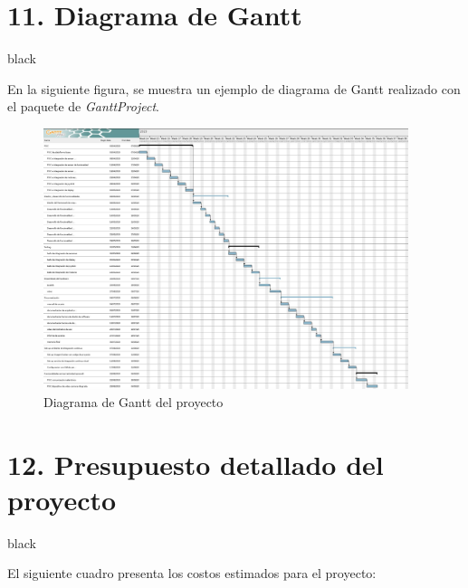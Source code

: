 \documentclass[
11pt, %
codirector, %
]{charter}
\begin{document}
\section{11. Diagrama de Gantt}
\label{sec:gantt}

\begin{consigna}{black}

En la siguiente figura, se muestra un ejemplo de diagrama de Gantt realizado con el paquete de \textit{GanttProject}. 

\begin{figure}[htpb]
\centering 
\includegraphics[width=0.95\textwidth]{./Figuras/Captura_Robot_Plan.png}
\caption{Diagrama de Gantt del proyecto}
\label{fig:diagGantt}
\end{figure}
\end{consigna}

\section{12. Presupuesto detallado del proyecto}
\label{sec:presupuesto}

\begin{consigna}{black}

El siguiente cuadro presenta los costos estimados para el proyecto:

\end{consigna}
\end{document}
